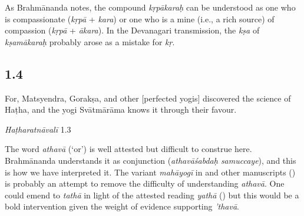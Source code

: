 \begin{ekdosis}
\begin{philcomm}[hp01_003]

As Brahmānanda notes, the compound \emph{kṛpākaraḥ} can be understood as one who is compassionate (\emph{kṛpā} + \emph{kara}) or one who is a mine (i.e., a rich source) of compassion (\emph{kṛpā} + \emph{ākara}). In the Devanagari transmission, the \emph{kṣa} of \emph{kṣamākaraḥ} probably arose as a mistake for \emph{kṛ}.       
\end{philcomm}

\subsection*{1.4}
\begin{translation}[hp01_004]
For, Matsyendra, Gorakṣa, and other [perfected yogis] discovered the science of Haṭha, and the yogi Svātmārāma knows it through their favour.
\end{translation}

\begin{testimonia}[hp01_004]
\emph{Haṭharatnāvalī} 1.3

\begin{versinnote}
\end{versinnote}

\end{testimonia}

\begin{philcomm}[hp01_004]   
The word \emph{athavā} (‘or’) is well attested but difficult to construe here. Brahmānanda understands it as conjunction (\emph{athavāśabdaḥ samuccaye}), and this is how we have interpreted it. The variant \emph{mahāyogī} in \epsilonOne and other manuscripts () is probably an attempt to remove the difficulty of understanding \emph{athavā}. One could emend to \emph{tathā} in light of the attested reading \emph{yathā} () but this would be a bold intervention given the weight of evidence supporting \emph{’thavā}.   
\end{philcomm}


\end{ekdosis}
